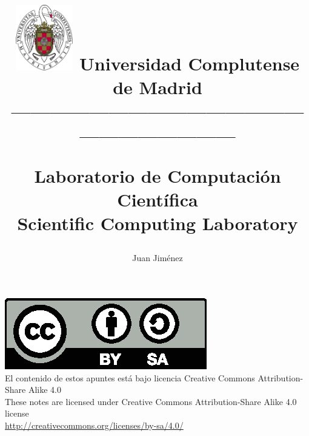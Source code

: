 \documentclass[a4paper,10pt]{book}
\begin{document}
\title{
\begin{flushleft}
\includegraphics[width=2.5cm]{ucm2.pdf} 
Universidad Complutense de Madrid\\
---------------------------------------------------------------------
\end{flushleft}
Laboratorio de Computación Científica\\ Scientific Computing Laboratory}
\author{ Juan Jim\'enez\\}
\maketitle
\vspace*{\fill}
\includegraphics[scale=1]{by-sa.eps}\\
El contenido de estos apuntes está bajo licencia Creative Commons Attribution-Share Alike 4.0\\
These notes are licensed under Creative Commons Attribution-Share Alike 4.0 license\\  
\href{http://creativecommons.org/licenses/by-sa/4.0/}{http://creativecommons.org/licenses/by-sa/4.0/}\\

\bigskip
\tableofcontents
\listoffigures
\listoftables


%
%

%
%
%
%
%
%
\printindex
\end{document}

